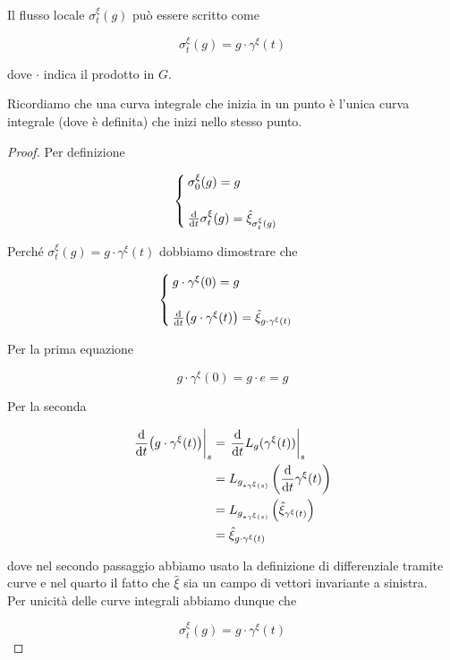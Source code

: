 \begin{definition}
	Il flusso locale $ \sigma_{t}^{\xi}(g) $ può essere scritto come
	
	\begin{equation}
		\sigma_{t}^{\xi}(g) = g \cdot \gamma^{\xi}(t)
	\end{equation}

	dove $ \cdot $ indica il prodotto in $ G $.
\end{definition}

Ricordiamo che una curva integrale che inizia in un punto è l'unica curva integrale (dove è definita) che inizi nello stesso punto.

\begin{proof}
	Per definizione
	
	\begin{equation}
		\begin{cases}
			\sigma_{0}^{\xi}(g) = g\\\\
			\dv{t} \sigma_{t}^{\xi}(g) = \hat{\xi}_{\sigma_{t}^{\xi}(g)}
		\end{cases}
	\end{equation}

	Perché $ \sigma_{t}^{\xi}(g) = g \cdot \gamma^{\xi}(t) $ dobbiamo dimostrare che
	
	\begin{equation}
		\begin{cases}
			g \cdot \gamma^{\xi}(0) = g\\\\
			\dv{t} (g \cdot \gamma^{\xi}(t)) = \hat{\xi}_{g \cdot \gamma^{\xi}(t)}
		\end{cases}
	\end{equation}

	Per la prima equazione
	
	\begin{equation}
		g \cdot \gamma^{\xi}(0) = g \cdot e = g
	\end{equation}

	Per la seconda
	
	\begin{align}
		\begin{split}
			\eval{ \dv{t} (g \cdot \gamma^{\xi}(t)) }_{s} &= \eval{ \dv{t} L_{g}(\gamma^{\xi}(t)) }_{s}\\
			&= L_{g_{*\gamma^{\xi}(s)}} \left( \dv{t} \gamma^{\xi}(t) \right)\\
			&= L_{g_{*\gamma^{\xi}(s)}} \left( \hat{\xi}_{\gamma^{\xi}(t)} \right)\\
			&= \hat{\xi}_{g \cdot \gamma^{\xi}(t)}
		\end{split}
	\end{align}

	dove nel secondo passaggio abbiamo usato la definizione di differenziale tramite curve e nel quarto il fatto che $ \hat{\xi} $ sia un campo di vettori invariante a sinistra.\\
	Per unicità delle curve integrali abbiamo dunque che
	
	\begin{equation}
		\sigma_{t}^{\xi}(g) = g \cdot \gamma^{\xi}(t)
	\end{equation}
\end{proof}
	
